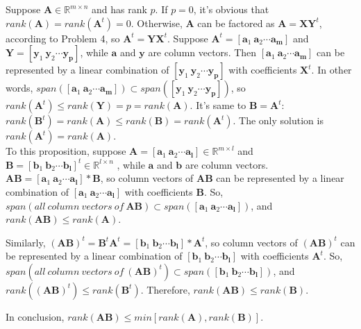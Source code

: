 \documentclass[22pt]{article}
\begin{document}
   		Suppose $\mathbf{A} \in \mathbb{R}^{m\times n}$ and has rank $p$. If $p=0$, it's obvious that $rank(\mathbf{A}) = rank(\mathbf{A}^t) = 0$. Otherwise, $\mathbf{A}$ can be factored as $\mathbf{A} = \mathbf{XY}^t$, according to Problem 4, so $\mathbf{A}^t = \mathbf{YX}^t$. Suppose $\mathbf{A}^t = [\mathbf{a}_1\ \mathbf{a}_2 \cdots \mathbf{a_m}]$ and $\mathbf{Y} = [\mathbf{y}_1\ \mathbf{y}_2 \cdots \mathbf{y_p}]$, while $\mathbf{a}$ and $\mathbf{y}$ are column vectors. Then $ [\mathbf{a}_1\ \mathbf{a}_2 \cdots \mathbf{a_m}]$ can be represented by a linear combination of $[\mathbf{y}_1\ \mathbf{y}_2 \cdots \mathbf{y_p}]$ with coefficients $\mathbf{X}^t$. In other words, $span([\mathbf{a}_1\ \mathbf{a}_2 \cdots \mathbf{a_m}]) \subset span([\mathbf{y}_1\ \mathbf{y}_2 \cdots \mathbf{y_p}])$, so $rank(\mathbf{A}^t) \leq rank(\mathbf{Y}) = p = rank(\mathbf{A})$. It's same to $\mathbf{B} = \mathbf{A}^t$: $rank(\mathbf{B}^t) = rank(\mathbf{A}) \leq rank(\mathbf{B}) = rank(\mathbf{A}^t)$. The only solution is $rank(\mathbf{A}^t) = rank(\mathbf{A})$.\\[1ex]

   		To this proposition, suppose $\mathbf{A} = [\mathbf{a}_1\ \mathbf{a}_2 \cdots \mathbf{a_l}] \in \mathbb{R}^{m\times l}$ and $\mathbf{B} = [\mathbf{b}_1\ \mathbf{b}_2 \cdots \mathbf{b_l}]^t \in \mathbb{R}^{l\times n}$ , while $\mathbf{a}$ and $\mathbf{b}$ are column vectors. $\mathbf{AB} = [\mathbf{a}_1\ \mathbf{a}_2 \cdots \mathbf{a_l}]*\mathbf{B}$, so column vectors of $\mathbf{AB}$ can be represented by a linear combination of $[\mathbf{a}_1\ \mathbf{a}_2 \cdots \mathbf{a_l}]$ with coefficients $\mathbf{B}$. So, $span(all\ column\ vectors\ of\ \mathbf{AB}) \subset span([\mathbf{a}_1\ \mathbf{a}_2 \cdots \mathbf{a_l}])$, and $rank(\mathbf{AB})\leq rank(\mathbf{A})$.

   		Similarly, $(\mathbf{AB})^t = \mathbf{B}^t\mathbf{A}^t = [\mathbf{b}_1\ \mathbf{b}_2 \cdots \mathbf{b_l}]*\mathbf{A}^t$, so column vectors of $(\mathbf{AB})^t$ can be represented by a linear combination of $[\mathbf{b}_1\ \mathbf{b}_2 \cdots \mathbf{b_l}]$ with coefficients $\mathbf{A}^t$. So, $span(all\ column\ vectors\ of\ (\mathbf{AB})^t) \subset span([\mathbf{b}_1\ \mathbf{b}_2 \cdots \mathbf{b_l}])$, and $rank((\mathbf{AB})^t)\leq rank(\mathbf{B}^t)$. Therefore, $rank(\mathbf{AB})\leq rank(\mathbf{B})$.

   		In conclusion,  $rank(\mathbf{AB})\leq min[rank(\mathbf{A}),rank(\mathbf{B})]$.
\end{document}
